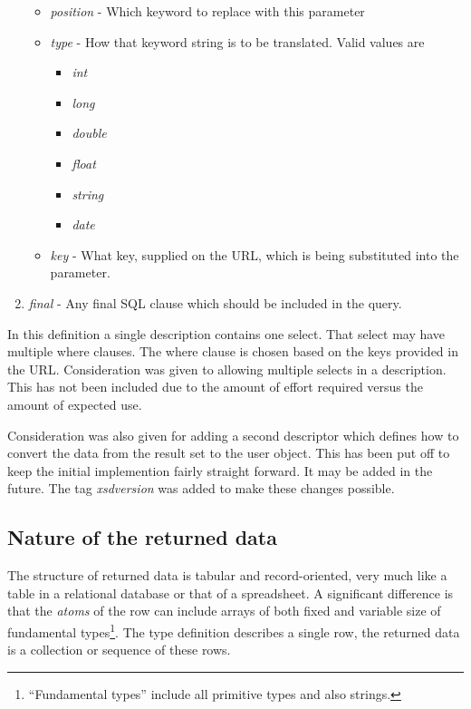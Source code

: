 \begin{enumerate}
\begin{itemize}
\item \emph{position} - Which keyword to replace with this parameter
\item \emph{type} - How that keyword string is to be translated.  Valid values are
\begin{itemize}
\item \emph{int}
\item \emph{long}
\item \emph{double}
\item \emph{float}
\item \emph{string}
\item \emph{date}
\end{itemize}
\item \emph{key} - What key, supplied on the URL, which is being substituted into the parameter.
\end{itemize}
\item \emph{final} - Any final SQL clause which should be included in the query.

\end{enumerate}

In this definition a single description contains one select.  That select may have multiple where
clauses.  The where clause is chosen based on the keys provided in the URL.  Consideration was given
to allowing multiple selects in a description.  This has not been included due to the amount of 
effort required versus the amount of expected use.  

Consideration was also given for adding a second descriptor which defines how to convert the data
from the result set to the user object.  This has been put off to keep the initial implemention
fairly straight forward.  It may be added in the future.  The tag \emph{xsdversion} was added to 
make these changes possible.


\subsection{Nature of the returned data}

The structure of returned data is tabular and
record-oriented, very much like a table in a relational database or that
of a spreadsheet.
A significant difference is that the \emph{atoms} of the row can include
arrays of both fixed and variable size of fundamental \cpp
types\footnote{``Fundamental types'' include all primitive types and
also strings.}.  The type definition describes a single row, the
returned data is a collection or sequence of these rows.

